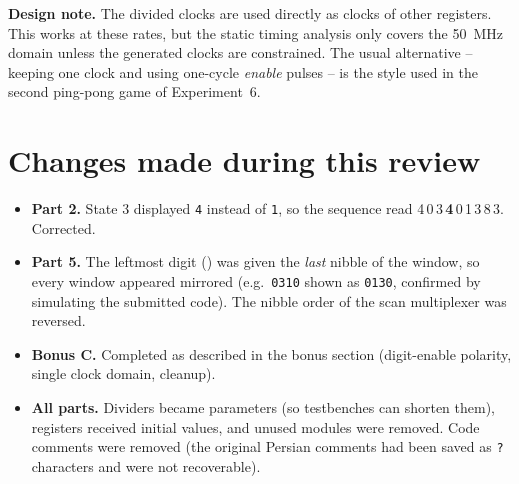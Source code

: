 \textbf{Design note.} The divided clocks are used directly as clocks of other registers. This works at
these rates, but the static timing analysis only covers the \SI{50}{MHz} domain unless the generated
clocks are constrained. The usual alternative -- keeping one clock and using one-cycle \emph{enable}
pulses -- is the style used in the second ping-pong game of Experiment~6.

\section{Changes made during this review}\label{sec:changes}
\begin{itemize}
  \item \textbf{Part 2.} State 3 displayed \texttt{4} instead of \texttt{1}, so the sequence read
        4\,0\,3\,\textbf{4}\,0\,1\,3\,8\,3. Corrected.
  \item \textbf{Part 5.} The leftmost digit () was given the \emph{last} nibble of the window,
        so every window appeared mirrored (e.g.\ \texttt{0310} shown as \texttt{0130}, confirmed by
        simulating the submitted code). The nibble order of the scan multiplexer was reversed.
  \item \textbf{Bonus C.} Completed as described in the bonus section (digit-enable polarity,
        single clock domain, cleanup).
  \item \textbf{All parts.} Dividers became parameters (so testbenches can shorten them), registers
        received initial values, and unused modules were removed. Code comments were removed (the original Persian comments had
        been saved as \texttt{?} characters and were not recoverable).
\end{itemize}

